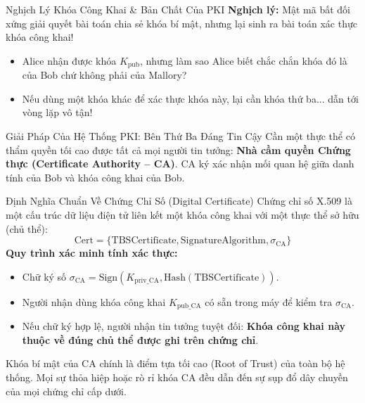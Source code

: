 \begin{frame}{Nghịch Lý Khóa Công Khai \& Bản Chất Của PKI}
  \textbf{Nghịch lý:} Mật mã bất đối xứng giải quyết bài toán chia sẻ khóa bí mật, nhưng lại sinh ra bài toán xác thực khóa công khai!
  \begin{itemize}
    \item Alice nhận được khóa $K_{\text{pub}}$, nhưng làm sao Alice biết chắc chắn khóa đó là của Bob chứ không phải của Mallory?
    \item Nếu dùng một khóa khác để xác thực khóa này, lại cần khóa thứ ba... dẫn tới vòng lặp vô tận!
  \end{itemize}

  \begin{block}{Giải Pháp Của Hệ Thống PKI: Bên Thứ Ba Đáng Tin Cậy}
    Cần một thực thể có thẩm quyền tối cao được tất cả mọi người tin tưởng: \textbf{Nhà cầm quyền Chứng thực (Certificate Authority -- CA)}. CA ký xác nhận mối quan hệ giữa danh tính của Bob và khóa công khai của Bob.
  \end{block}
\end{frame}

\begin{frame}{Định Nghĩa Chuẩn Về Chứng Chỉ Số (Digital Certificate)}
  Chứng chỉ số X.509 là một cấu trúc dữ liệu điện tử liên kết một khóa công khai với một thực thể sở hữu (chủ thể):
  $$\text{Cert} = \{\text{TBSCertificate}, \text{SignatureAlgorithm}, \sigma_{\text{CA}}\}$$
  \textbf{Quy trình xác minh tính xác thực:}
  \begin{itemize}\small
    \item Chữ ký số $\sigma_{\text{CA}} = \text{Sign}(K_{\text{priv\_CA}}, \text{Hash}(\text{TBSCertificate}))$.
    \item Người nhận dùng khóa công khai $K_{\text{pub\_CA}}$ có sẵn trong máy để kiểm tra $\sigma_{\text{CA}}$.
    \item Nếu chữ ký hợp lệ, người nhận tin tưởng tuyệt đối: \textbf{Khóa công khai này thuộc về đúng chủ thể được ghi trên chứng chỉ}.
  \end{itemize}

  \begin{pqcbox}
    Khóa bí mật của CA chính là điểm tựa tối cao (Root of Trust) của toàn bộ hệ thống. Mọi sự thỏa hiệp hoặc rò rỉ khóa CA đều dẫn đến sự sụp đổ dây chuyền của mọi chứng chỉ cấp dưới.
  \end{pqcbox}
\end{frame}

